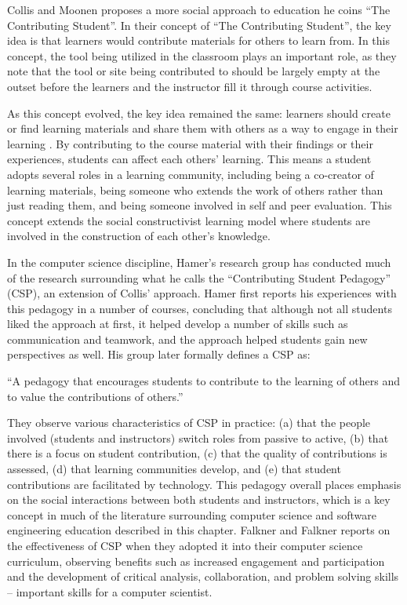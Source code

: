 \begin{itemize}
Collis and Moonen \cite{collis2001flexible} proposes a more social approach to education he coins ``The Contributing Student''. In their concept of ``The Contributing Student'', the key idea is that learners would contribute materials for others to learn from. In this concept, the tool being utilized in the classroom plays an important role, as they note that the tool or site being contributed to should be largely empty at the outset before the learners and the instructor fill it through course activities.

As this concept evolved, the key idea remained the same: learners should create or find learning materials and share them with others as a way to engage in their learning \cite{collis2006contributing}. By contributing to the course material with their findings or their experiences, students can affect each others' learning. This means a student adopts several roles in a learning community, including being a co-creator of learning materials, being someone who extends the work of others rather than just reading them, and being someone involved in self and peer evaluation. This concept extends the social constructivist learning model where students are involved in the construction of each other’s knowledge.

In the computer science discipline, Hamer’s research group has conducted much of the research surrounding what he calls the ``Contributing Student Pedagogy'' (CSP), an extension of Collis’ approach. Hamer first reports his experiences \cite{hamer2006some} with this pedagogy in a number of courses, concluding that although not all students liked the approach at first, it helped develop a number of skills such as communication and teamwork, and the approach helped students gain new perspectives as well. His group later formally defines a CSP \cite{hamer2008contributing} as:

``A pedagogy that encourages students to contribute to the learning of others and to value the contributions of others.''

They observe various characteristics of CSP in practice: (a) that the people involved (students and instructors) switch roles from passive to active, (b) that there is a focus on student contribution, (c) that the quality of contributions is assessed, (d) that learning communities develop, and (e) that student contributions are facilitated by technology. This pedagogy overall places emphasis on the social interactions between both students and instructors, which is a key concept in much of the literature surrounding computer science and software engineering education described in this chapter. Falkner and Falkner \cite{falkner2012supporting} reports on the effectiveness of CSP when they adopted it into their computer science curriculum, observing benefits such as increased engagement and participation and the development of critical analysis, collaboration, and problem solving skills – important skills for a computer scientist.


\end{itemize}
